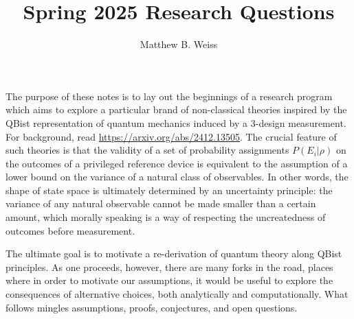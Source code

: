 \documentclass[11pt]{article}
\title{Spring 2025 Research Questions}
\author{Matthew B. Weiss}
\begin{document}
\maketitle

\section{}
The purpose of these notes is to lay out the beginnings of a research program which aims to explore a particular brand of non-classical theories inspired by the QBist representation of quantum mechanics induced by a 3-design measurement. For background, read \url{https://arxiv.org/abs/2412.13505}. The crucial feature of such theories is that the validity of a set of probability assignments $P(E_i|\rho)$ on the outcomes of a privileged reference device is equivalent to the assumption of a lower bound on the variance of a natural class of observables. In other words, the shape of state space is ultimately determined by an uncertainty principle: the variance of any natural observable cannot be made smaller than a certain amount, which morally speaking is a way of respecting the uncreatedness of outcomes before measurement. 

The ultimate goal is to motivate a re-derivation of quantum theory along QBist principles. As one proceeds, however, there are many forks in the road, places where in order to motivate our assumptions, it would be useful to explore the consequences of alternative choices, both analytically and computationally. What follows mingles assumptions, proofs, conjectures, and open questions.

\section{}
\end{document}
